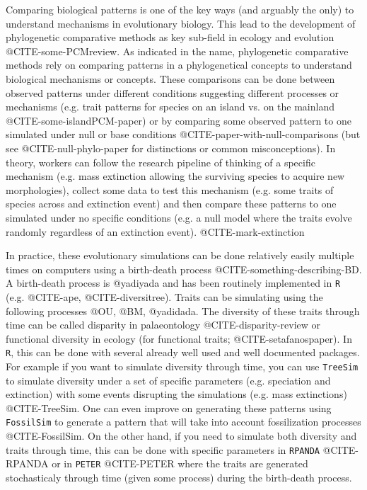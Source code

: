 \documentclass[12pt,letterpaper]{article}
\begin{document}
Comparing biological patterns is one of the key ways (and arguably the only) to understand mechanisms in evolutionary biology.
This lead to the development of phylogenetic comparative methods as key sub-field in ecology and evolution @CITE-some-PCMreview.
As indicated in the name, phylogenetic comparative methods rely on comparing patterns in a phylogenetical concepts to understand biological mechanisms or concepts.
These comparisons can be done between observed patterns under different conditions suggesting different processes or mechanisms (e.g. trait patterns for species on an island vs. on the mainland @CITE-some-islandPCM-paper) or by comparing some observed pattern to one simulated under null or base conditions @CITE-paper-with-null-comparisons (but see @CITE-null-phylo-paper for distinctions or common misconceptions).
In theory, workers can follow the research pipeline of thinking of a specific mechanism (e.g. mass extinction allowing the surviving species to acquire new morphologies), collect some data to test this mechanism (e.g. some traits of species across and extinction event) and then compare these patterns to one simulated under no specific conditions (e.g. a null model where the traits evolve randomly regardless of an extinction event). @CITE-mark-extinction

In practice, these evolutionary simulations can be done relatively easily multiple times on computers using a birth-death process @CITE-something-describing-BD.
A birth-death process is @yadiyada and has been routinely implemented in \texttt{R} (e.g. @CITE-ape, @CITE-diversitree).
Traits can be simulating using the following processes @OU, @BM, @yadidada.
The diversity of these traits through time can be called disparity in palaeontology @CITE-disparity-review or functional diversity in ecology (for functional traits; @CITE-setafanospaper).
In \texttt{R}, this can be done with several already well used and well documented packages.
For example if you want to simulate diversity through time, you can use \texttt{TreeSim} to simulate diversity under a set of specific parameters (e.g. speciation and extinction) with some events disrupting the simulations (e.g. mass extinctions) @CITE-TreeSim.
One can even improve on generating these patterns using \texttt{FossilSim} to generate a pattern that will take into account fossilization processes @CITE-FossilSim.
On the other hand, if you need to simulate both diversity and traits through time, this can be done with specific parameters in \texttt{RPANDA} @CITE-RPANDA or in \texttt{PETER} @CITE-PETER where the traits are generated stochasticaly through time (given some process) during the birth-death process.
\end{document}
